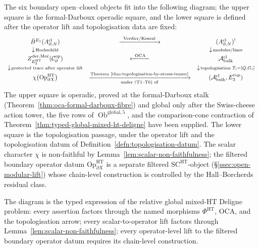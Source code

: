 The six boundary open--closed objects fit into the following diagram;
the upper square is the formal-Darboux operadic square, and the lower
square is defined after the operator lift and topologisation data are
fixed:
\[
  \begin{array}{ccc}
    \bar B^{E_1}(A^{\mathrm{cl}}_{\partial,N})
       & \xrightarrow{\;\;\mathrm{Verdier/Koszul}\;\;}
       & (A^{\mathrm{cl}}_{\partial,N})^!\\
    \downarrow\!{\scriptstyle \mathrm{Hochschild}}
       & & \downarrow\!{\scriptstyle \mathrm{modules/lines}}\\
    Z^{\mathrm{der},\mathrm{Mor}}_{E_2^{\mathrm{HT}}}(\mathcal C^{\mathrm{op}}_\partial)
       & \xleftarrow{\;\;\mathrm{OCA}\;\;}
       & \mathcal A^{\mathrm{cl}}_{\mathrm{bulk}}\\
    \downarrow\!{\scriptstyle \text{protected trace after operator lift}}
       & & \downarrow\!{\scriptstyle \text{topologisation }T_i=[Q,G_i]}\\
    \chi\bigl(\mathrm{Op}^{\mathrm{HT}}_{\partial X}\bigr)
       & \xrightarrow[\text{under (T1--T6) of}]
                     {\text{Theorem~\ref{thm:topologisation-by-stress-tensor}}}
       & (\mathcal A^{\mathrm{cl}}_{\mathrm{bulk}},
          E_3^{\mathrm{top}})
  \end{array}
\]
The upper square is operadic, proved at the formal-Darboux stalk
(Theorem~\ref{thm:oca-formal-darboux-fibre}) and global only after the
Swiss-cheese action tower, the five rows of
\(\operatorname{Ob}^{\mathrm{global},5}\), and the comparison-cone
contraction of Theorem~\ref{thm:typed-global-mixed-ht-deligne} have been
supplied.  The lower square is the topologisation
passage, under the operator lift and the topologisation datum
of Definition~\ref{defn:topologisation-datum}.  The scalar character
\(\chi\) is non-faithful by
Lemma~\ref{lem:scalar-non-faithfulness}; the filtered boundary
operator datum
\(\mathrm{Op}^{\mathrm{HT}}_{\partial X}\) is a separate filtered
\(\mathrm{SC}^{\mathrm{HT}}\)-object
(\S\ref{ssec:open-modular-lift}) whose chain-level
construction is controlled by the Hall--Borcherds residual class.

The diagram is the typed expression of the relative global mixed-HT
Deligne problem: every assertion factors through the named morphisms
\(\Phi^{\mathrm{HT}}\), \(\mathrm{OCA}\), and the topologisation
arrow; every scalar-to-operator lift factors through
Lemma~\ref{lem:scalar-non-faithfulness}; every operator-level lift to
the filtered boundary operator datum requires its chain-level
construction.

